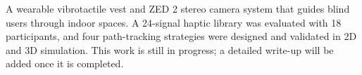 \ProjectSkipTitlePage
\ProjectAbstractFirst
{}

\begin{ProjectSummary}
A wearable vibrotactile vest and ZED 2 stereo camera system that guides blind users through
indoor spaces. A 24-signal haptic library was evaluated with 18 participants, and four path-tracking strategies
were designed and validated in 2D and 3D simulation.
This work is still in progress; a detailed write-up will be added once it is completed.
\end{ProjectSummary}

\ProjectDocument{}
